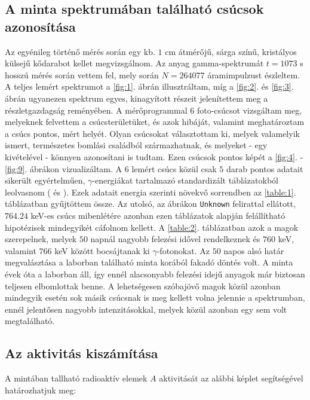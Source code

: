\begin{multicols}{2}
\subsection{A minta spektrumában található csúcsok azonosítása}
Az egyénileg történő mérés során egy kb. $1$ cm átmérőjű, sárga színű, kristályos külsejű kődarabot kellet megvizsgálnom. Az anyag gamma-spektrumát $t = 1073$ s hosszú mérés során vettem fel, mely során $N = 264077$ áramimpulzust észleltem. A teljes lemért spektrumot a \ref{fig:1}. ábrán illusztráltam, míg a \ref{fig:2}. és \ref{fig:3}. ábrán ugyanezen spektrum egyes, kinagyított részeit jelenítettem meg a részletgazdagság reményében. \newline
A mérőprogrammal $6$ foto-csúcsot vizsgáltam meg, melyeknek felvettem a csúcsterületüket, és azok hibáját, valamint meghatároztam a csúcs pontos, mért helyét. Olyan csúcsokat választottam ki, melyek valamelyik ismert, természetes bomlási családból származhatnak, és melyeket - egy kivételével - könnyen azonosítani is tudtam. Ezen csúcsok pontos képét a \ref{fig:4}. - \ref{fig:9}. ábrákon vizualizáltam. \newline
A $6$ lemért csúcs közül csak $5$ darab pontos adatait sikerült egyértelműen, $\gamma$-energiákat tartalmazó standardizált táblázatokból leolvasnom (\cite{firestone19978th} és \cite{lnbl_nuclear}). Ezek adatait energia szerinti növekvő sorrendben az \ref{table:1}. táblázatban gyűjtöttem össze. Az utolsó, az ábrákon \texttt{Unknown} felirattal ellátott, $764.24$ keV-es csúcs mibenlétére azonban ezen táblázatok alapján felállítható hipotézisek mindegyikét cáfolnom kellett. A \ref{table:2}. táblázatban azok a magok szerepelnek, melyek $50$ napnál nagyobb felezési idővel rendelkeznek és $760$ keV, valamint $766$ keV között bocsájtanak ki $\gamma$-fotonokat. Az $50$ napos alsó határ megvalásztása a laborban található minta korából fakadó döntés volt. A minta évek óta a laborban áll, így ennél alacsonyabb felezési idejű anyagok már biztosan teljesen elbomlottak benne. A lehetségesen szóbajövő magok közül azonban mindegyik esetén sok másik csúcsnak is meg kellett volna jelennie a spektrumban, ennél jelentősen nagyobb intenzitásokkal, melyek közül azonban egy sem volt megtalálható.

\subsection{Az aktivitás kiszámítása}
A mintában tallható radioaktív elemek $A$ aktivitását az alábbi képlet segítségével határozhatjuk meg:


\end{multicols}
